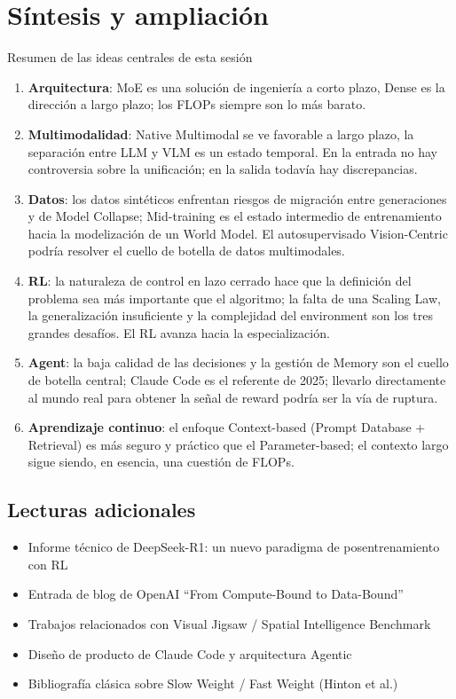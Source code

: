 \section{Síntesis y ampliación}

\begin{importantbox}{Resumen de las ideas centrales de esta sesión}
\begin{enumerate}
  \item \textbf{Arquitectura}: MoE es una solución de ingeniería a corto plazo, Dense es la dirección a largo plazo; los FLOPs siempre son lo más barato.
  \item \textbf{Multimodalidad}: Native Multimodal se ve favorable a largo plazo, la separación entre LLM y VLM es un estado temporal. En la entrada no hay controversia sobre la unificación; en la salida todavía hay discrepancias.
  \item \textbf{Datos}: los datos sintéticos enfrentan riesgos de migración entre generaciones y de Model Collapse; Mid-training es el estado intermedio de entrenamiento hacia la modelización de un World Model. El autosupervisado Vision-Centric podría resolver el cuello de botella de datos multimodales.
  \item \textbf{RL}: la naturaleza de control en lazo cerrado hace que la definición del problema sea más importante que el algoritmo; la falta de una Scaling Law, la generalización insuficiente y la complejidad del environment son los tres grandes desafíos. El RL avanza hacia la especialización.
  \item \textbf{Agent}: la baja calidad de las decisiones y la gestión de Memory son el cuello de botella central; Claude Code es el referente de 2025; llevarlo directamente al mundo real para obtener la señal de reward podría ser la vía de ruptura.
  \item \textbf{Aprendizaje continuo}: el enfoque Context-based (Prompt Database + Retrieval) es más seguro y práctico que el Parameter-based; el contexto largo sigue siendo, en esencia, una cuestión de FLOPs.
\end{enumerate}
\end{importantbox}

\subsection{Lecturas adicionales}
\begin{itemize}
  \item Informe técnico de DeepSeek-R1: un nuevo paradigma de posentrenamiento con RL
  \item Entrada de blog de OpenAI ``From Compute-Bound to Data-Bound''
  \item Trabajos relacionados con Visual Jigsaw / Spatial Intelligence Benchmark
  \item Diseño de producto de Claude Code y arquitectura Agentic
  \item Bibliografía clásica sobre Slow Weight / Fast Weight (Hinton et al.)
\end{itemize}



